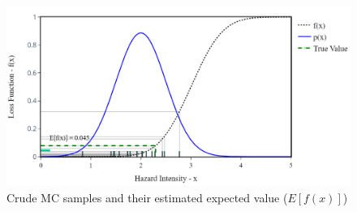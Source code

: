     \begin{figure}[H]
        \centering
        \includegraphics[scale=0.5]{Figures/Images/Illustrative Example/crude_MC_samples.png}
        \caption{Crude MC samples and their estimated expected value ($E[f(x)]$)}
        \label{fig:crude_MC_samples}
    \end{figure}
